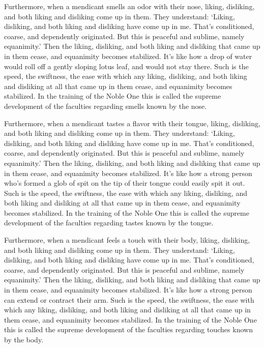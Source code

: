 \documentclass[12pt,openany]{book}%
\begin{document}
Furthermore, when a mendicant smells an odor with their nose, liking, disliking, and both liking and disliking come up in them. They understand: ‘Liking, disliking, and both liking and disliking have come up in me. That’s conditioned, coarse, and dependently originated. But this is peaceful and sublime, namely equanimity.’ Then the liking, disliking, and both liking and disliking that came up in them cease, and equanimity becomes stabilized. It’s like how a drop of water would roll off a gently sloping lotus leaf, and would not stay there. Such is the speed, the swiftness, the ease with which any liking, disliking, and both liking and disliking at all that came up in them cease, and equanimity becomes stabilized. In the training of the Noble One this is called the supreme development of the faculties regarding smells known by the nose. 

Furthermore, when a mendicant tastes a flavor with their tongue, liking, disliking, and both liking and disliking come up in them. They understand: ‘Liking, disliking, and both liking and disliking have come up in me. That’s conditioned, coarse, and dependently originated. But this is peaceful and sublime, namely equanimity.’ Then the liking, disliking, and both liking and disliking that came up in them cease, and equanimity becomes stabilized. It’s like how a strong person who’s formed a glob of spit on the tip of their tongue could easily spit it out. Such is the speed, the swiftness, the ease with which any liking, disliking, and both liking and disliking at all that came up in them cease, and equanimity becomes stabilized. In the training of the Noble One this is called the supreme development of the faculties regarding tastes known by the tongue. 

Furthermore, when a mendicant feels a touch with their body, liking, disliking, and both liking and disliking come up in them. They understand: ‘Liking, disliking, and both liking and disliking have come up in me. That’s conditioned, coarse, and dependently originated. But this is peaceful and sublime, namely equanimity.’ Then the liking, disliking, and both liking and disliking that came up in them cease, and equanimity becomes stabilized. It’s like how a strong person can extend or contract their arm. Such is the speed, the swiftness, the ease with which any liking, disliking, and both liking and disliking at all that came up in them cease, and equanimity becomes stabilized. In the training of the Noble One this is called the supreme development of the faculties regarding touches known by the body. 
\end{document}
